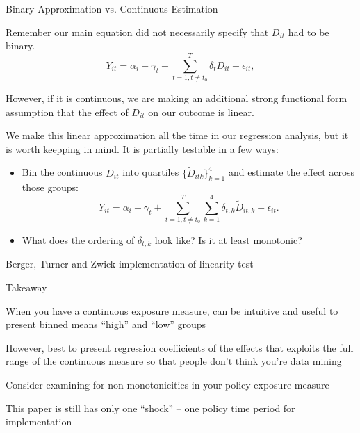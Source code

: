 \documentclass[notes,11pt, aspectratio=169]{beamer}
\newenvironment{wideitemize}{\itemize\addtolength{\itemsep}{10pt}}{\enditemize}
\begin{document}
\begin{frame}{Binary Approximation vs. Continuous Estimation}
  \begin{wideitemize}
    \item Remember our main equation did not necessarily specify that $D_{it}$ had to be binary. 
      \begin{equation}
      Y_{it} = \alpha_{i} + \gamma_{t} + \sum_{t=1, t\not=t_{0}}^{T}\delta_{t} D_{it} + \epsilon_{it},
    \end{equation}
  \item However, if it is continuous, we are making an additional
    strong functional form assumption that the effect of $D_{it}$ on our
    outcome is linear.
  \item We make this linear approximation all the time in our
    regression analysis, but it is worth keepping in mind. It is
    partially testable in a few ways:
    \begin{itemize}
    \item Bin the continuous $D_{it}$ into quartiles $\{\widetilde{D}_{itk}\}_{k=1}^{4}$ and estimate the effect across those groups:
      \begin{equation}
        Y_{it} = \alpha_{i} + \gamma_{t} + \sum_{t=1, t\not=t_{0}}^{T}\sum_{k=1}^{4}\delta_{t,k} \widetilde{D}_{it,k} + \epsilon_{it}.
      \end{equation}
    \item What does the ordering of $\delta_{t,k}$ look like? Is it at least monotonic?
    \end{itemize}
  \end{wideitemize}
\end{frame}

\begin{frame}{Berger, Turner and Zwick implementation of linearity test}
\end{frame}

\begin{frame}{Takeaway}
  \begin{wideitemize}
  \item When you have a continuous exposure measure, can be intuitive
    and useful to present binned means ``high'' and ``low'' groups
  \item However, best to present regression coefficients of the
    effects that exploits the full range of the continuous measure so
    that people don't think you're data mining
  \item Consider examining for non-monotonicities in your policy exposure measure
  \item This paper is still has only one ``shock'' -- one policy time period for implementation
  \end{wideitemize}
\end{frame}
\end{document}
